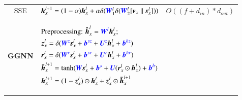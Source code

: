 \begin{table}[H]
\begin{footnotesize}
\begin{tabular}{clr}
            SSE             \cite{han2018_sse}                                                                                                                                                                               &
            $\boldsymbol{h}_x^{l+1} = (1 - \alpha)  \boldsymbol{h}_x^l +\alpha    \delta(\textcolor{blue}{\boldsymbol{W}}^l_1 \delta(\textcolor{blue}{\boldsymbol{W}}^l_2 [\boldsymbol{v}_x \parallel \boldsymbol{s}_x^l]))$ &
            $O((f + d_{in}) * d_{out})$                                                                                                                                                                                        \\
            \textbf{GGNN}    \cite{li2015_ggnn}                                                                                                                                                                              &
            \begin{scriptsize}
                $\begin{aligned}[t]
                         & \text{Preprocessing: } \boldsymbol{\hat{h}}^l_x = \textcolor{blue}{\boldsymbol{W}^l}\boldsymbol{h}^l_x; \\
                         & {\boldsymbol{z}}_x^l = \delta ( \textcolor{blue}{\boldsymbol{W}^z} \boldsymbol{s}_x^l + \textcolor{blue}{\boldsymbol{b}^{sz}} + \textcolor{blue}{\boldsymbol{U}^z} \boldsymbol{h}_x^{l} + \textcolor{blue}{\boldsymbol{b}^{hz}})                    \\
                         & \boldsymbol{r}_x^l = \delta ( \textcolor{blue}{\boldsymbol{W}^r} \boldsymbol{s}_x^l+ \textcolor{blue}{\boldsymbol{b}^{sr}} +\textcolor{blue}{\boldsymbol{U}^r} \boldsymbol{h}_x^{l} + \textcolor{blue}{\boldsymbol{b}^{hr}})                        \\
                         & \boldsymbol{\bar{h}}_x^{l+1} = \tanh ( \textcolor{blue}{\boldsymbol{W}} \boldsymbol{s}_x^l + \textcolor{blue}{\boldsymbol{b}^s} + \textcolor{blue}{\boldsymbol{U}} ( \boldsymbol{r}_x^l \odot \boldsymbol{h}_x^{l}) + \textcolor{blue}{\boldsymbol{b}^h}) \\
                         & \boldsymbol{h}_x^{l+1} = (1 - {\boldsymbol{z}}_x^l) \odot \boldsymbol{h}_x^l + {\boldsymbol{z}}_x^l \odot \boldsymbol{\bar{h}}_x^{l+1}
                    \end{aligned}$
            \end{scriptsize}
                                                                                                                                                                                                                             &

\end{tabular}
\end{footnotesize}
\end{table}
